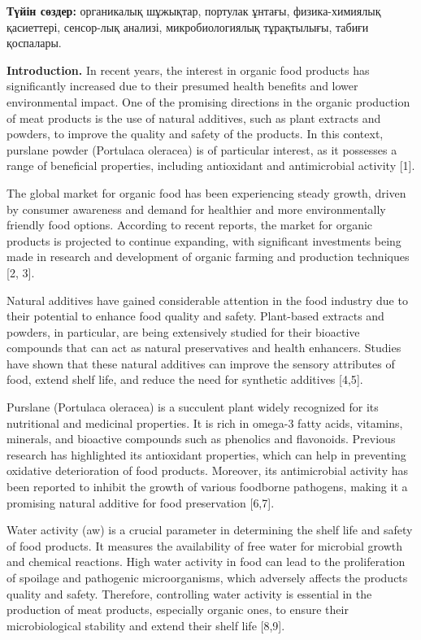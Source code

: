 {\bfseries Түйін сөздер:} органикалық шұжықтар, портулак ұнтағы,
физика-химиялық қасиеттері, сенсор-лық анализі, микробиологиялық
тұрақтылығы, табиғи қоспалары.

{\bfseries Introduction.} In recent years, the interest in organic food
products has significantly increased due to their presumed health
benefits and lower environmental impact. One of the promising directions
in the organic production of meat products is the use of natural
additives, such as plant extracts and powders, to improve the quality
and safety of the products. In this context, purslane powder (Portulaca
oleracea) is of particular interest, as it possesses a range of
beneficial properties, including antioxidant and antimicrobial activity
{[}1{]}.

The global market for organic food has been experiencing steady growth,
driven by consumer awareness and demand for healthier and more
environmentally friendly food options. According to recent reports, the
market for organic products is projected to continue expanding, with
significant investments being made in research and development of
organic farming and production techniques {[}2, 3{]}.

Natural additives have gained considerable attention in the food
industry due to their potential to enhance food quality and safety.
Plant-based extracts and powders, in particular, are being extensively
studied for their bioactive compounds that can act as natural
preservatives and health enhancers. Studies have shown that these
natural additives can improve the sensory attributes of food, extend
shelf life, and reduce the need for synthetic additives {[}4,5{]}.

Purslane (Portulaca oleracea) is a succulent plant widely recognized for
its nutritional and medicinal properties. It is rich in omega-3 fatty
acids, vitamins, minerals, and bioactive compounds such as phenolics and
flavonoids. Previous research has highlighted its antioxidant
properties, which can help in preventing oxidative deterioration of food
products. Moreover, its antimicrobial activity has been reported to
inhibit the growth of various foodborne pathogens, making it a promising
natural additive for food preservation {[}6,7{]}.

Water activity (aw) is a crucial parameter in determining the shelf life
and safety of food products. It measures the availability of free water
for microbial growth and chemical reactions. High water activity in food
can lead to the proliferation of spoilage and pathogenic microorganisms,
which adversely affects the product\textquotesingle s quality and
safety. Therefore, controlling water activity is essential in the
production of meat products, especially organic ones, to ensure their
microbiological stability and extend their shelf life {[}8,9{]}.

